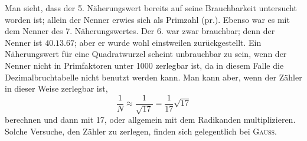 \endgroup
\setcounter{footnote}{1}
\par\noindent\hspace*{\parindent}Man sieht, dass der 5. Näherungswert bereits auf seine Brauchbarkeit
untersucht worden ist; allein der Nenner erwies sich als Primzahl (pr.).
Ebenso war es mit dem Nenner des 7. Näherungswertes. Der 6. war zwar
brauchbar; denn der Nenner ist $40\mathord{.}13\mathord{.}67$; aber er wurde wohl einstweilen
zurückgestellt. Ein Näherungswert für eine Quadratwurzel scheint unbrauchbar zu sein, wenn der Nenner nicht in Primfaktoren unter 1000 zerlegbar ist,
da in diesem Falle die Dezimalbruchtabelle nicht benutzt werden kann. Man
kann aber, wenn der Zähler in dieser Weise zerlegbar ist,
\[
\frac{1}{N}\approx\frac{1}{\sqrt{17}}=\frac{1}{17}\sqrt{17}
\]
\noindent berechnen und dann mit 17, oder allgemein mit dem Radikanden multiplizieren. Solche Versuche, den Zähler zu zerlegen, finden sich gelegentlich
bei \textsc{Gauss}.

